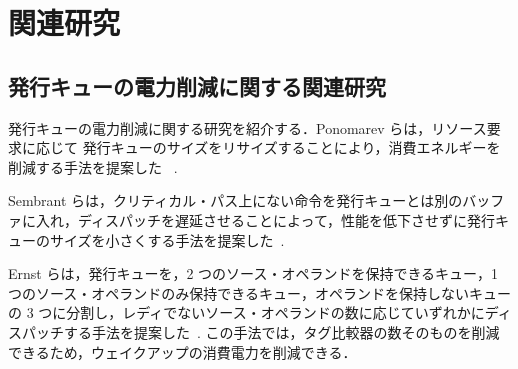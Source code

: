
\chapter{関連研究}
\label{sec:related_work}

\section{発行キューの電力削減に関する関連研究}
発行キューの電力削減に関する研究を紹介する．Ponomarev らは，リソース要求に応じて 発行キューのサイズをリサイズすることにより，消費エネルギーを削減する手法を提案した~\cite{ponomarev2001} .

Sembrant らは，クリティカル・パス上にない命令を発行キューとは別のバッファに入れ，ディスパッチを遅延させることによって，性能を低下させずに発行キューのサイズを小さくする手法を提案した~\cite{Sembrant2015}.

Ernst らは，発行キューを，2 つのソース・オペランドを保持できるキュー，1 つのソース・オペランドのみ保持できるキュー，オペランドを保持しないキューの 3 つに分割し，レディでないソース・オペランドの数に応じていずれかにディスパッチする手法を提案した~\cite{ernst2002}. この手法では，タグ比較器の数そのものを削減できるため，ウェイクアップの消費電力を削減できる．
